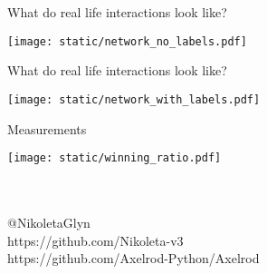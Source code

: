 \documentclass{beamer}
\begin{document}
\begin{frame}{What do real life interactions look like?}
\begin{center}
		\texttt{[image: static/network\_no\_labels.pdf]}
\end{center}
\end{frame}

\begin{frame}{What do real life interactions look like?}
\begin{center}
		\texttt{[image: static/network\_with\_labels.pdf]}
\end{center}
\end{frame}

\begin{frame}{Measurements}
	\begin{center}
		\texttt{[image: static/winning\_ratio.pdf]}
	\end{center}
\end{frame}

\begin{frame}
	\begin{center}
		\huge{\textbf{}}\\~\\
		\small{@NikoletaGlyn}\\
		\small{https://github.com/Nikoleta-v3}\\
		\small{https://github.com/Axelrod-Python/Axelrod}
	\end{center}
\end{frame}
\end{document}
